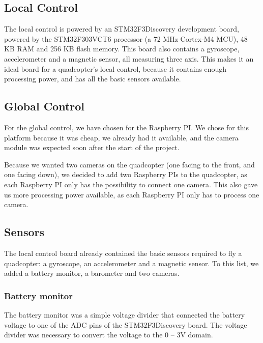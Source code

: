 \documentclass[11pt, a4paper, onecolumn, oneside, parskip=half]{scrartcl}
\begin{document}
\subsection{Local Control}
\label{sec:arch:local}
The local control is powered by an STM32F3Discovery development board, powered by the STM32F303VCT6 processor (a 72 MHz Cortex-M4 MCU), 48 KB RAM and 256 KB flash memory. This board also contains a gyroscope, accelerometer and a magnetic sensor, all measuring three axis. This makes it an ideal board for a quadcopter's local control, because it contains enough processing power, and has all the basic sensors available.

\subsection{Global Control}
\label{sec:arch:global}
For the global control, we have chosen for the Raspberry PI. We chose for this platform because it was cheap, we already had it available, and the camera module was expected soon after the start of the project.

Because we wanted two cameras on the quadcopter (one facing to the front, and one facing down), we decided to add two Raspberry PIs to the quadcopter, as each Raspberry PI only has the possibility to connect one camera. This also gave us more processing power available, as each Raspberry PI only has to process one camera.

\subsection{Sensors}
\label{sec:arch:sensors}
The local control board already contained the basic sensors required to fly a quadcopter: a gyroscope, an accelerometer and a magnetic sensor. To this list, we added a battery monitor, a barometer and two cameras.

\subsubsection{Battery monitor}
\label{sec:arch:sensors:battery}
The battery monitor was a simple voltage divider that connected the battery voltage to one of the ADC pins of the STM32F3Discovery board. The voltage divider was necessary to convert the voltage to the 0 -- 3V domain.
\end{document}
